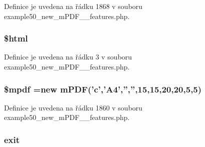 Definice je uvedena na řádku 1868 v souboru example50\-\_\-new\-\_\-m\-P\-D\-F\-\_\-\_\-features.\-php.

\hypertarget{example50__new__m_p_d_f__3__features_8php_a6f96e7fc92441776c9d1cd3386663b40}{
\subsubsection[{\$html}]{\setlength{\rightskip}{0pt plus 5cm}\$html}}\label{example50__new__m_p_d_f__3__features_8php_a6f96e7fc92441776c9d1cd3386663b40}


Definice je uvedena na řádku 3 v souboru example50\-\_\-new\-\_\-m\-P\-D\-F\-\_\-\_\-features.\-php.

\hypertarget{example50__new__m_p_d_f__3__features_8php_ad028f81910d6cbab9b184d2214b3a8f8}{
\subsubsection[{\$mpdf}]{\setlength{\rightskip}{0pt plus 5cm}\$mpdf =new {\bf m\-P\-D\-F}('c','A4','','',15,15,20,20,5,5)}}\label{example50__new__m_p_d_f__3__features_8php_ad028f81910d6cbab9b184d2214b3a8f8}


Definice je uvedena na řádku 1860 v souboru example50\-\_\-new\-\_\-m\-P\-D\-F\-\_\-\_\-features.\-php.

\hypertarget{example50__new__m_p_d_f__3__features_8php_a6733eb5f605d09eaede9845835d71c4e}{
\subsubsection[{exit}]{\setlength{\rightskip}{0pt plus 5cm}exit}}\label{example50__new__m_p_d_f__3__features_8php_a6733eb5f605d09eaede9845835d71c4e}


